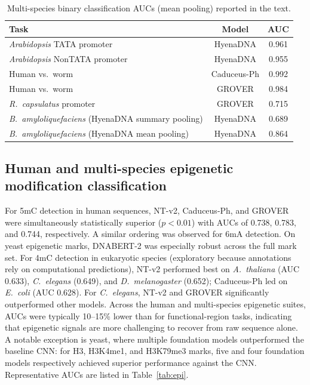 \documentclass[11pt,a4paper]{article}
\begin{document}
\begin{table}[t]
\centering
\caption{Multi-species binary classification AUCs (mean pooling) reported in the text.}
\label{tab:multispec}
\begin{tabular}{lcc}
\toprule
Task & Model & AUC \\
\midrule
\emph{Arabidopsis} TATA promoter       & HyenaDNA    & 0.961 \\
\emph{Arabidopsis} NonTATA promoter    & HyenaDNA    & 0.955 \\
Human vs.\ worm                        & Caduceus-Ph & 0.992 \\
Human vs.\ worm                        & GROVER      & 0.984 \\
\emph{R.~capsulatus} promoter          & GROVER      & 0.715 \\
\emph{B.~amyloliquefaciens} (HyenaDNA summary pooling)  & HyenaDNA & 0.689 \\
\emph{B.~amyloliquefaciens} (HyenaDNA mean pooling)     & HyenaDNA & 0.864 \\
\bottomrule
\end{tabular}
\end{table}

\subsection{Human and multi-species epigenetic modification classification}
For 5mC detection in human sequences, NT-v2, Caduceus-Ph, and GROVER were simultaneously statistically superior ($p<0.01$) with AUCs of 0.738, 0.783, and 0.744, respectively. A similar ordering was observed for 6mA detection. On yeast epigenetic marks, DNABERT-2 was especially robust across the full mark set. For 4mC detection in eukaryotic species (exploratory because annotations rely on computational predictions), NT-v2 performed best on \emph{A.~thaliana} (AUC 0.633), \emph{C.~elegans} (0.649), and \emph{D.~melanogaster} (0.652); Caduceus-Ph led on \emph{E.~coli} (AUC 0.628). For \emph{C.~elegans}, NT-v2 and GROVER significantly outperformed other models. Across the human and multi-species epigenetic suites, AUCs were typically 10--15\% lower than for functional-region tasks, indicating that epigenetic signals are more challenging to recover from raw sequence alone. A notable exception is yeast, where multiple foundation models outperformed the baseline CNN: for H3, H3K4me1, and H3K79me3 marks, five and four foundation models respectively achieved superior performance against the CNN. Representative AUCs are listed in Table~\ref{tab:epi}.
\end{document}
